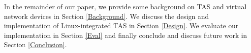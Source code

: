 In the remainder of our paper, we provide some background on TAS and virtual
network devices in Section \ref{Background}. We discuss the design and
implementation of Linux-integrated TAS in Section \ref{Design}. We evaluate
our implementation in Section \ref{Eval} and finally conclude and discuss
future work in Section \ref{Conclusion}.
